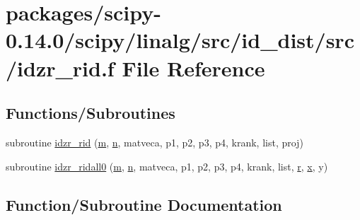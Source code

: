 \hypertarget{idzr__rid_8f}{}\section{packages/scipy-\/0.14.0/scipy/linalg/src/id\+\_\+dist/src/idzr\+\_\+rid.f File Reference}
\label{idzr__rid_8f}
\subsection*{Functions/\+Subroutines}
\begin{DoxyCompactItemize}
\item 
subroutine \hyperlink{idzr__rid_8f_aa98675cfb754dac0b350943ca3dc2e62}{idzr\+\_\+rid} (\hyperlink{indexexpr_8h_ab72fdb4031d47b75ab26dd18a437bcdc}{m}, \hyperlink{indexexpr_8h_ab427e2e2b4d6cec55fa088ea2a692ace}{n}, matveca, p1, p2, p3, p4, krank, list, proj)
\item 
subroutine \hyperlink{idzr__rid_8f_a60c556d787dc8af314d87f1998af9e33}{idzr\+\_\+ridall0} (\hyperlink{indexexpr_8h_ab72fdb4031d47b75ab26dd18a437bcdc}{m}, \hyperlink{indexexpr_8h_ab427e2e2b4d6cec55fa088ea2a692ace}{n}, matveca, p1, p2, p3, p4, krank, list, \hyperlink{indexexpr_8h_ac434fd11cc2493608d8d91424d60c17e}{r}, \hyperlink{vecnorm1_8cc_ac73eed9e41ec09d58f112f06c2d6cb63}{x}, y)
\end{DoxyCompactItemize}


\subsection{Function/\+Subroutine Documentation}
\hypertarget{idzr__rid_8f_aa98675cfb754dac0b350943ca3dc2e62}{}
